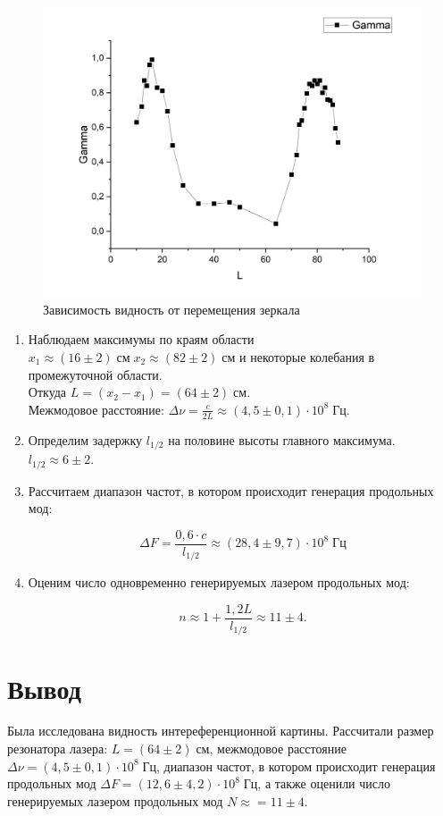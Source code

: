 \documentclass[a4paper,12pt]{article}
\begin{document}
\begin{figure}[h!]
	\begin{center}
		\includegraphics[scale = 0.5]{3.png}
		\caption{Зависимость видность от перемещения зеркала}
		\label{p1}
	\end{center}
\end{figure}
\begin{enumerate}
\item Наблюдаем максимумы по краям области $x_1 \approx (16 \pm 2) \; см \; x_2 \approx (82 \pm 2) \; см $ и некоторые колебания в промежуточной области. \\
Откуда $L = (x_2 - x_1) = (64 \pm 2) \; см$.\\
Межмодовое расстояние: $\varDelta\nu = \frac{c}{2L} \approx (4,5 \pm 0,1)\cdot 10^8 \; Гц$.
\item Определим задержку $l_{1/2}$ на половине высоты главного максимума.\\
$l_{1/2} \approx 6 \pm 2$.
\item Рассчитаем диапазон частот, в котором происходит генерация продольных мод:

\begin{equation}
\varDelta F = \frac{0,6\cdot c}{l_{1/2}} \approx (28,4 \pm 9,7)\cdot 10^8 \; Гц
\end{equation}

\item Оценим число одновременно генерируемых лазером продольных мод:

\begin{equation}
n \approx 1 + \frac{1,2L}{l_{1/2}} \approx 11 \pm 4. 
\end{equation}
\end{enumerate} 
\section{Вывод} 
Была исследована видность интереференционной картины. Рассчитали размер резонатора лазера:  $L = (64 \pm 2) \; см$, межмодовое расстояние $\varDelta\nu = (4,5 \pm 0,1)\cdot 10^8 \; Гц$, диапазон частот, в котором происходит генерация продольных мод $\varDelta F = (12,6 \pm 4,2)\cdot 10^8 \; Гц$, а также оценили число генерируемых лазером продольных мод $	N \approx = 11 \pm 4.$
\end{document}
